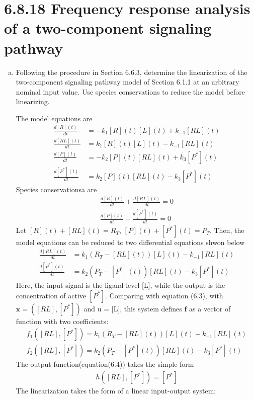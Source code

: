 \documentclass[paper=a4, fontsize=11pt]{scrartcl} %
\numberwithin{equation}{section} %
\numberwithin{figure}{section} %
\numberwithin{table}{section} %
\begin{document}
\section{6.8.18 Frequency response analysis of a two-component signaling pathway}
	\begin{enumerate}[a)]
		\item Following the procedure in Section 6.6.3, determine the linearization of the two-component signaling pathway model of Section 6.1.1 at an arbitrary nominal input value. Use species conservations to reduce the model before linearizing.

		The model equations are
		\begin{align*}
			\frac{d[R](t)}{dt}  &= -k_1[R](t)[L](t) + k_{-1}[RL](t)\\
			\frac{d[RL](t)}{dt} &= k_1[R](t)[L](t) - k_{-1}[RL](t)\\
			\frac{d[P](t)}{dt}  &= -k_2[P](t)[RL](t) + k_3[P^*](t)\\
			\frac{d[P^*](t)}{dt}&= k_2[P](t)[RL](t) - k_3[P^*](t)
		\end{align*}
		Species conservationsa are
		\begin{align*}
			\frac{d[R](t)}{dt}  + \frac{d[RL](t)}{dt} = 0\\
			\frac{d[P](t)}{dt}  + \frac{d[P^*](t)}{dt} = 0
		\end{align*}
		Let $[R](t)+[RL](t)=R_T$, $[P](t)+[P^*](t)=P_T$. Then, the model equations can be reduced to two differential equations shwon below
		\begin{align*}
			\frac{d[RL](t)}{dt} &= k_1(R_T-[RL](t))[L](t) - k_{-1}[RL](t)\\
			\frac{d[P^*](t)}{dt}&= k_2(P_T-[P^*](t))[RL](t) - k_3[P^*](t)
		\end{align*}
		Here, the input signal is the ligand level [L], while the output is the concentration of active $[P^*]$. Comparing with equation (6.3), with $\mathbf{x} = ([RL],[P^*])$ and u = [L], this system defines $\mathbf{f}$ as a vector of function with two coefficients:
		\begin{align*}
			f_1([RL],[P^*])= k_1(R_T-[RL](t))[L](t) - k_{-1}[RL](t)\\
			f_2([RL],[P^*])= k_2(P_T-[P^*](t))[RL](t) - k_3[P^*](t)
		\end{align*}
		The output function(equation(6.4)) takes the simple form
		\begin{align*}
			h([RL],[P^*])=[P^*]
		\end{align*}
		The linearization takes the form of a linear input-output system:

\end{enumerate}
\end{document}
